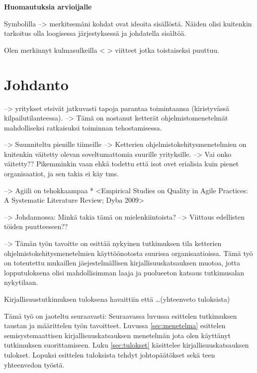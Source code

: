 
\textbf{Huomautuksia arvioijalle}

Symbolilla --> merkitsemäni kohdat ovat ideoita sisällöstä. Näiden olisi
kuitenkin tarkoitus olla loogisessa järjestyksessä ja johdatella sisältöä.

Olen merkinnyt kulmasulkeilla < > viitteet jotka toistaiseksi puuttuu.

\section{Johdanto}

--> yritykset etsivät jatkuvasti tapoja parantaa toimintaansa (kiristyvässä
kilpailutilanteessa). --> Tämä on nostanut ketterät ohjelmistomenetelmät
mahdolliseksi ratkaisuksi toiminnan tehostamisessa.

--> Suunniteltu pienille tiimeille --> Ketterien ohjelmistokehitysmenetelmien on
kuitenkin väitetty olevan soveltumattomia suurille yrityksille. --> Vai onko
väitetty?? Pikemminkin vaan ehkä todettu että isot ovet erialisia kuin pienet
organisaatiot, ja sen takia ei käy tms.

--> Agiili on tehokkaampaa
  * <Empirical Studies on Quality in Agile Practices: A Systematic Literature Review; Dyba 2009>

--> Johdannossa: Minkä takia tämä on mielenkiintoista? 
--> Viittaus edellisten töiden puutteeseen??

--> Tämän työn tavoitte on esittää nykyinen tutkimuksen tila ketterien
ohjelmistokehitysmenetelmien käyttöönotosta suurissa organisaatioissa. Tämä työ
on toteutettu mukaillen jäejestelmällisen kirjallisuuskatsauksen muotoa, jotta
lopputuloksena olisi mahdollisimman laaja ja puolueeton katsaus tutkimusalan
nykytilaan.

Kirjallisuustutkimuksen tuloksena havaittiin että \ldots (yhteenveto tuloksista)


Tämä työ on jaoteltu seuraavasti:
Seuraavassa luvussa esittelen tutkimuksen taustan ja määrittelen työn
tavoitteet. Luvussa \ref{sec:menetelma} esittelen semisystemaattisen
kirjallisuuskatsauksen menetelmän jota olen käyttänyt tutkimuksen
suorittamiseen. Luku \ref{sec:tulokset} käsittelee kirjallisuuskatsauksen
tulokset. Lopuksi esittelen tuloksista tehdyt johtopäätökset sekä teen
yhteenvedon työstä.




